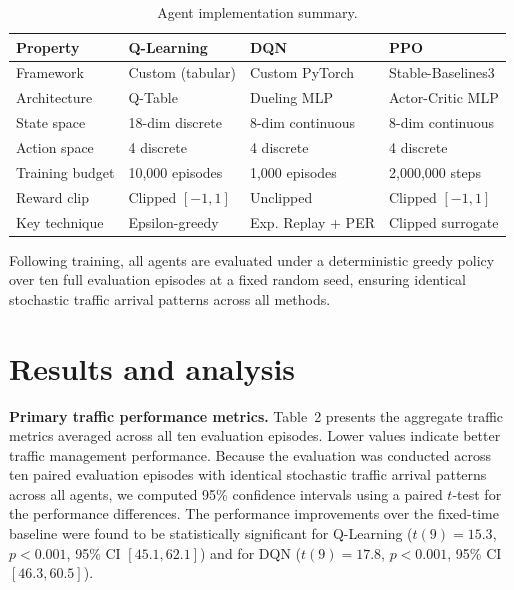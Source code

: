 \documentclass[10pt,a4paper]{article}
\begin{document}
\begin{table}[H]
\centering
\caption{Agent implementation summary.}
\vspace{0.5em}
\begin{tabular}{l l l l}
\toprule
\textbf{Property} & \textbf{Q-Learning} & \textbf{DQN} & \textbf{PPO} \\
\midrule
Framework        & Custom (tabular)      & Custom PyTorch        & Stable-Baselines3 \\
Architecture     & Q-Table               & Dueling MLP           & Actor-Critic MLP \\
State space      & 18-dim discrete       & 8-dim continuous      & 8-dim continuous \\
Action space     & 4 discrete            & 4 discrete            & 4 discrete \\
Training budget  & 10,000 episodes       & 1,000 episodes        & 2,000,000 steps \\
Reward clip      & Clipped $[-1,1]$      & Unclipped             & Clipped $[-1,1]$ \\
Key technique    & Epsilon-greedy        & Exp. Replay + PER     & Clipped surrogate \\
\bottomrule
\end{tabular}
\label{tab:implementation}
\end{table}

Following training, all agents are evaluated under a deterministic greedy policy over ten full evaluation episodes at a fixed random seed, ensuring identical stochastic traffic arrival patterns across all methods.

\section{Results and analysis}

\textbf{Primary traffic performance metrics.}
Table~2 presents the aggregate traffic metrics averaged across all ten evaluation episodes. Lower values indicate better traffic management performance. Because the evaluation was conducted across ten paired evaluation episodes with identical stochastic traffic arrival patterns across all agents, we computed 95\% confidence intervals using a paired $t$-test for the performance differences. The performance improvements over the fixed-time baseline were found to be statistically significant for Q-Learning ($t(9) = 15.3$, $p < 0.001$, 95\% CI $[45.1, 62.1]$) and for DQN ($t(9) = 17.8$, $p < 0.001$, 95\% CI $[46.3, 60.5]$).
\end{document}
